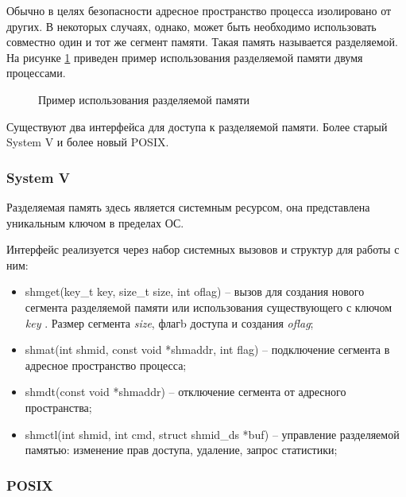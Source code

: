 Обычно в целях безопасности адресное пространство процесса изолировано от других. В некоторых случаях, однако, может быть необходимо использовать совместно один и тот же сегмент памяти. Такая память называется разделяемой. На рисунке \ref{chapter11:ShMem} приведен пример использования разделяемой памяти двумя процессами.

\begin{figure}[!h]
\caption{Пример использования разделяемой памяти}
\label{chapter11:ShMem}
\end{figure}

Существуют два интерфейса для доступа к разделяемой памяти. Более старый System V и более новый POSIX.

\subsubsection{System V}

Разделяемая память здесь является системным ресурсом, она представлена уникальным ключом в пределах ОС.

Интерфейс реализуется через набор системных вызовов и структур для работы с ним:
\begin{itemize}
\item shmget(key\_t key, size\_t size, int oflag) -- вызов для создания нового сегмента разделяемой памяти или использования существующего с ключом \textit{key} . Размер сегмента \textit{size}, флагb доступа и создания \textit{oflag};
\item shmat(int shmid, const void *shmaddr, int flag) -- подключение сегмента в адресное пространство процесса;
\item shmdt(const void *shmaddr) -- отключение сегмента от адресного пространства;
\item shmctl(int shmid, int cmd, struct shmid\_ds *buf) -- управление разделяемой памятью: изменение прав доступа, удаление, запрос статистики;
\end{itemize}

\subsubsection{POSIX}

